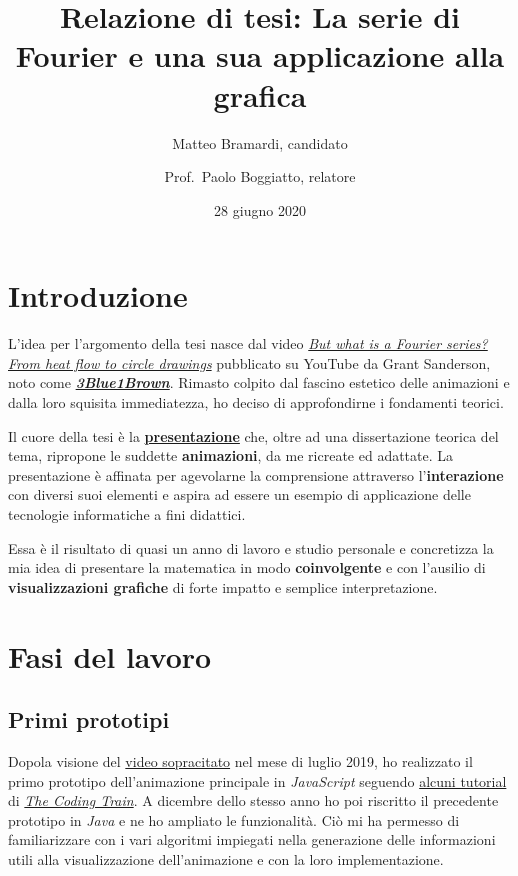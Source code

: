 \documentclass[
]{book}
\title{Relazione di tesi: La serie di Fourier e una sua applicazione alla grafica}
\author{Matteo Bramardi, candidato \and Prof.~Paolo Boggiatto, relatore}
\date{28 giugno 2020}
\begin{document}
\maketitle

{
\setcounter{tocdepth}{1}
\tableofcontents
}
\hypertarget{introduzione}{%
\chapter*{Introduzione}\label{introduzione}}

L'idea per l'argomento della tesi nasce dal video \href{https://www.youtube.com/watch?v=r6sGWTCMz2k}{\emph{But what is a Fourier series? From heat flow to circle drawings}} pubblicato su YouTube da Grant Sanderson, noto come \href{https://www.youtube.com/c/3blue1brown}{\emph{\textbf{3Blue1Brown}}}. Rimasto colpito dal fascino estetico delle animazioni e dalla loro squisita immediatezza, ho deciso di approfondirne i fondamenti teorici.

Il cuore della tesi è la \href{https://bradwave.github.io/thesis}{\textbf{presentazione}} che, oltre ad una dissertazione teorica del tema, ripropone le suddette \textbf{animazioni}, da me ricreate ed adattate. La presentazione è affinata per agevolarne la comprensione attraverso l'\textbf{interazione} con diversi suoi elementi e aspira ad essere un esempio di applicazione delle tecnologie informatiche a fini didattici.

Essa è il risultato di quasi un anno di lavoro e studio personale e concretizza la mia idea di presentare la matematica in modo \textbf{coinvolgente} e con l'ausilio di \textbf{visualizzazioni grafiche} di forte impatto e semplice interpretazione.

\hypertarget{lavoro}{%
\chapter{Fasi del lavoro}\label{lavoro}}

\hypertarget{prototipi}{%
\section{Primi prototipi}\label{prototipi}}

Dopola visione del \href{https://www.youtube.com/watch?v=r6sGWTCMz2k}{video sopracitato} nel mese di luglio 2019, ho realizzato il primo prototipo dell'animazione principale in \emph{JavaScript} seguendo \href{https://www.youtube.com/watch?v=MY4luNgGfms}{alcuni tutorial} di \href{https://www.youtube.com/thecodingtrain}{\emph{The Coding Train}}. A dicembre dello stesso anno ho poi riscritto il precedente prototipo in \emph{Java} e ne ho ampliato le funzionalità. Ciò mi ha permesso di familiarizzare con i vari algoritmi impiegati nella generazione delle informazioni utili alla visualizzazione dell'animazione e con la loro implementazione.
\end{document}
